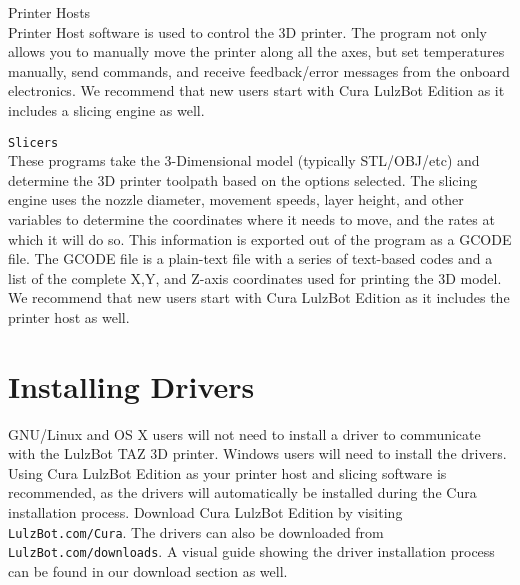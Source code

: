 \begin{description}
\item{Printer Hosts} \hfill \\
Printer Host software is used to control the 3D printer. The program not only allows you to manually move the printer along all the axes, but set temperatures manually, send commands, and receive feedback/error messages from the onboard electronics. We recommend that new users start with Cura LulzBot\textsuperscript{\miniscule{\textregistered}} Edition as it includes a slicing engine as well.

\item{\texttt{Slicers}} \hfill \\
These programs take the 3-Dimensional model (typically STL/OBJ/etc) and determine the 3D printer toolpath based on the options selected. The slicing engine uses the nozzle diameter, movement speeds, layer height, and other variables to determine the coordinates where it needs to move, and the rates at which it will do so. This information is exported out of the program as a GCODE file. The GCODE file is a plain-text file with a series of text-based codes and a list of the complete X,Y, and Z-axis coordinates used for printing the 3D model. We recommend that new users start with Cura LulzBot Edition as it includes the printer host as well.


\end{description}

\section{Installing Drivers}
GNU/Linux and OS X users will not need to install a driver to communicate with the LulzBot TAZ 3D printer. Windows users will need to install the drivers. Using Cura LulzBot Edition as your printer host and slicing software is recommended, as the drivers will automatically be installed during the Cura installation process. Download Cura LulzBot Edition by visiting \texttt{LulzBot.com/Cura}. The drivers can also be downloaded from \texttt{LulzBot.com/downloads}. A visual guide showing the driver installation process can be found in our download section as well.


